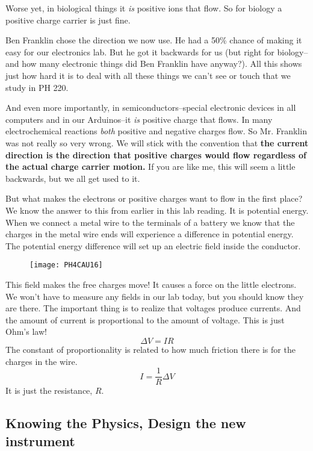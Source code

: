 Worse yet, in biological things it \emph{is} positive ions that flow. So for
biology a positive charge carrier is just fine.

Ben Franklin chose the direction we now use. He had a 50\% chance of making
it easy for our electronics lab. But he got it backwards for us (but right
for biology--and how many electronic things did Ben Franklin have anyway?).
All this shows just how hard it is to deal with all these things we can't
see or touch that we study in PH 220.

And even more importantly, in semiconductors--special electronic devices in
all computers and in our Arduinos--it \emph{is} positive charge that flows.
In many electrochemical reactions \emph{both} positive and negative charges
flow. So Mr. Franklin was not really so very wrong. We will stick with the
convention that \textbf{the current direction is the direction that positive
charges would flow regardless of the actual charge carrier motion. }If you
are like me, this will seem a little backwards, but we all get used to it.

But what makes the electrons or positive charges want to flow in the first
place? We know the answer to this from earlier in this lab reading. It is
potential energy. When we connect a metal wire to the terminals of a battery
we know that the charges in the metal wire ends will experience a difference
in potential energy. The potential energy difference will set up an electric
field inside the conductor. 

\begin{figure}[h!]
	\centering
    \texttt{[image: PH4CAU16]}
\end{figure}

This field makes the free charges move! It causes a force on the little
electrons. We won't have to measure any fields in our lab today, but you
should know they are there. The important thing is to realize that voltages
produce currents. And the amount of current is proportional to the amount of
voltage. This is just Ohm's law! 
\begin{equation*}
\Delta V=IR
\end{equation*}%
The constant of proportionality is related to how much friction there is for
the charges in the wire.%
\begin{equation*}
I=\frac{1}{R}\Delta V
\end{equation*}%
It is just the resistance, $R$.\ 

\subsection{Knowing the Physics, Design the new instrument}

